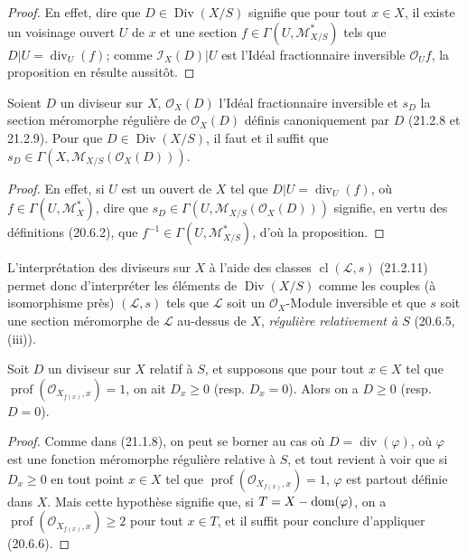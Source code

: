 \begin{proof}
En effet, dire que $D\in\operatorname{Div}(X/S)$ signifie que pour tout $x\in X$, il
existe un voisinage ouvert $U$ de $x$ et une section
$f\in\Gamma(U,\mathscr M_{X/S}^*)$ tels que $D|U=\operatorname{div}_U(f)$; comme
$\mathscr I_X(D)|U$ est l'Idéal fractionnaire inversible $\mathcal O_Uf$, la
proposition en résulte aussitôt.
\end{proof}

\begin{proposition}[21.15.5]
\label{IV.21.15.5}
Soient $D$ un diviseur sur $X$, $\mathcal O_X(D)$ l'Idéal fractionnaire inversible et
$s_D$ la section méromorphe régulière de $\mathcal O_X(D)$ définis canoniquement par
$D$ \textup{(21.2.8 et 21.2.9)}. Pour que $D\in\operatorname{Div}(X/S)$, il faut et il suffit
que $s_D\in\Gamma(X,\mathscr M_{X/S}(\mathcal O_X(D)))$.
\end{proposition}

\begin{proof}
En effet, si $U$ est un ouvert de $X$ tel que $D|U=\operatorname{div}_U(f)$, où
$f\in\Gamma(U,\mathscr M_X^*)$, dire que
$s_D\in\Gamma(U,\mathscr M_{X/S}(\mathcal O_X(D)))$ signifie, en vertu des
définitions (20.6.2), que $f^{-1}\in\Gamma(U,\mathscr M_{X/S}^*)$, d'où la
proposition.
\end{proof}

L'interprétation des diviseurs sur $X$ à l'aide des classes
$\operatorname{cl}(\mathscr L,s)$ (21.2.11) permet donc d'interpréter les éléments de
$\operatorname{Div}(X/S)$ comme les couples (à isomorphisme près) $(\mathscr L,s)$
tels que $\mathscr L$ soit un $\mathcal O_X$-Module inversible et que $s$ soit une
section méromorphe de $\mathscr L$ au-dessus de $X$, \emph{régulière relativement à
$S$} (20.6.5, (iii)).

\begin{proposition}[21.15.6]
\label{IV.21.15.6}
Soit $D$ un diviseur sur $X$ relatif à $S$, et supposons que pour tout $x\in X$ tel
que $\operatorname{prof}(\mathcal O_{X_{f(x)},x})=1$, on ait $D_x\geq0$
\textup{(resp. $D_x=0$)}. Alors on a $D\geq0$ \textup{(resp. $D=0$)}.
\end{proposition}

\begin{proof}
Comme dans (21.1.8), on peut se borner au cas où $D=\operatorname{div}(\varphi)$, où
$\varphi$ est une fonction méromorphe régulière relative à $S$, et tout revient à voir
que si $D_x\geq0$ en tout point $x\in X$ tel que
$\operatorname{prof}(\mathcal O_{X_{f(x)},x})=1$, $\varphi$ est partout définie dans
$X$. Mais cette hypothèse signifie que, si $T=X-\operatorname{dom}(\varphi)$, on a
$\operatorname{prof}(\mathcal O_{X_{f(x)},x})\geq2$ pour tout $x\in T$, et il suffit
pour conclure d'appliquer (20.6.6).
\end{proof}

